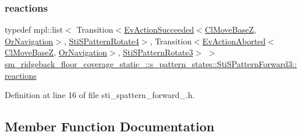 \subsubsection{\texorpdfstring{reactions}{reactions}}
{\footnotesize\ttfamily typedef mpl\+::list$<$ Transition$<$\hyperlink{structsmacc_1_1default__events_1_1EvActionSucceeded}{Ev\+Action\+Succeeded}$<$\hyperlink{classcl__move__base__z_1_1ClMoveBaseZ}{Cl\+Move\+BaseZ}, \hyperlink{classsm__ridgeback__floor__coverage__static__1_1_1OrNavigation}{Or\+Navigation}$>$, \hyperlink{structsm__ridgeback__floor__coverage__static__1_1_1s__pattern__states_1_1StiSPatternRotate4}{Sti\+S\+Pattern\+Rotate4}$>$, Transition$<$\hyperlink{structsmacc_1_1default__events_1_1EvActionAborted}{Ev\+Action\+Aborted}$<$\hyperlink{classcl__move__base__z_1_1ClMoveBaseZ}{Cl\+Move\+BaseZ}, \hyperlink{classsm__ridgeback__floor__coverage__static__1_1_1OrNavigation}{Or\+Navigation}$>$, \hyperlink{structsm__ridgeback__floor__coverage__static__1_1_1s__pattern__states_1_1StiSPatternRotate3}{Sti\+S\+Pattern\+Rotate3}$>$ $>$ \hyperlink{structsm__ridgeback__floor__coverage__static__1_1_1s__pattern__states_1_1StiSPatternForward3_a6ee6a50e8f5141dc5d996a15f82b72dd}{sm\+\_\+ridgeback\+\_\+floor\+\_\+coverage\+\_\+static\+\_\+::s\+\_\+pattern\+\_\+states\+::\+Sti\+S\+Pattern\+Forward3\+::reactions}}



Definition at line 16 of file sti\+\_\+spattern\+\_\+forward\+\_.\+h.



\subsection{Member Function Documentation}
\mbox{\label{structsm__ridgeback__floor__coverage__static__1_1_1s__pattern__states_1_1StiSPatternForward3_afbff4dcd50079369dda6b8e3d44b5608}} 
